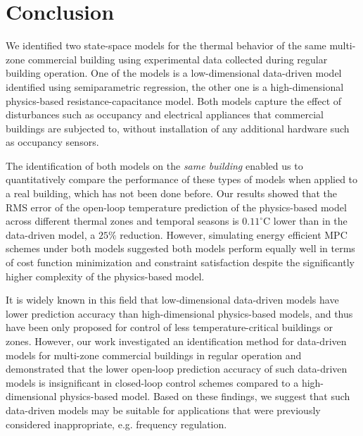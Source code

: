 
\section{Conclusion}
\label{sec:Conclusion}

We identified two state-space models for the thermal behavior of the same multi-zone commercial building using experimental data collected during regular building operation. One of the models is a low-dimensional data-driven model identified using semiparametric regression, the other one is a high-dimensional physics-based resistance-capacitance model. Both models capture the effect of disturbances such as occupancy and electrical appliances that commercial buildings are subjected to, without installation of any additional hardware such as occupancy sensors. 

The identification of both models on the \textit{same building} enabled us to quantitatively compare the performance of these types of models when applied to a real building, which has not been done before. Our results showed that the RMS error of the open-loop temperature prediction of the physics-based model across different thermal zones and temporal seasons is $0.11^\circ \text{C}$ lower than in the data-driven model, a $25\%$ reduction. However, simulating energy efficient MPC schemes under both models suggested both models perform equally well in terms of cost function minimization and constraint satisfaction despite the significantly higher complexity of the physics-based model.


It is widely known in this field that low-dimensional data-driven models have lower prediction accuracy than high-dimensional physics-based models, and thus have been only proposed for control of less temperature-critical buildings or zones. However, our work investigated an identification method for data-driven models for multi-zone commercial buildings in regular operation and demonstrated that the lower open-loop prediction accuracy of such data-driven models is insignificant in closed-loop control schemes compared to a high-dimensional physics-based model. Based on these findings, we suggest that such data-driven models may be suitable for applications that were previously considered inappropriate, e.g. frequency regulation.

